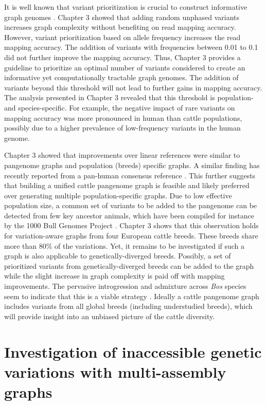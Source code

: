 \documentclass[../main.tex]{subfiles}
\begin{document}
It is well known that variant prioritization is crucial to construct informative graph genomes \citep{pritt2018forge,jain2021variant}. Chapter 3 showed that adding random unphased variants increases graph complexity without benefiting on read mapping accuracy. However, variant prioritization based on allele frequency increases the read mapping accuracy. The addition of variants with frequencies between 0.01 to 0.1 did not further improve the mapping accuracy. Thus, Chapter 3 provides a guideline to prioritize an optimal number of variants considered to create an informative yet computationally tractable graph genomes. The addition of variants beyond this threshold will not lead to further gains in mapping accuracy. The analysis presented in Chapter 3 revealed that this threshold is population- and species-specific. For example, the negative impact of rare variants on mapping accuracy was more pronounced in human than cattle populations, possibly due to a higher prevalence of low-frequency variants in the human genome. 

Chapter 3 showed that improvements over linear references were similar to pangenome graphs and population (breeds) specific graphs. A similar finding has recently reported from a pan-human consensus reference \citep{kaminow2020virtue}. This further suggests that building a unified cattle pangenome graph is feasible and likely preferred over generating multiple population-specific graphs. Due to low effective population size, a common set of variants to be added to the pangenome can be detected from few key ancestor animals, which have been compiled for instance by the 1000 Bull Genomes Project \citep{hayes20191000}.  Chapter 3 shows that this observation holds for variation-aware graphs from four European cattle breeds. These breeds share more than 80\% of the variations. Yet, it remains to be investigated  if such a graph is also applicable to genetically-diverged breeds. Possibly, a set of prioritized variants from genetically-diverged breeds can be added to the graph while the slight increase in graph complexity is paid off with mapping improvements. The pervasive introgression and admixture across \emph{Bos} species seem to indicate that this is a viable strategy \citep{wu2018pervasive}. Ideally a cattle pangenome graph includes variants from all global breeds (including understudied breeds), which will provide insight into an unbiased picture of the cattle diversity. 

\section[Investigation of complete variations with multi-assembly graphs]{Investigation of inaccessible genetic variations with multi-assembly graphs}
\end{document}
